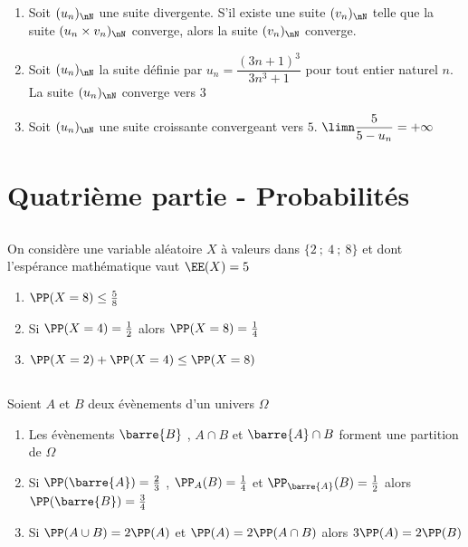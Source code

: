 \documentclass[oneside,12pt]{article}
\begin{document}
\subsection{}
\begin{enumerate}
	\item Soit $(u_n)_{\nN}$ une suite divergente. S'il existe une suite $(v_n)_{\nN}$ telle que la suite $(u_n\times v_n)_{\nN}$ converge, alors la suite $(v_n)_{\nN}$ converge.
	\item Soit $(u_n)_{\nN}$ la suite définie par $u_n=\dfrac{(3n+1)^3}{3n^3+1}$ pour tout entier naturel $n$. La suite $(u_n)_{\nN}$ converge vers $3$
	\item Soit $(u_n)_{\nN}$ une suite croissante convergeant vers $5$. $\limn \dfrac{5}{5-u_n}=+\infty$
\end{enumerate}



\section*{Quatrième partie - Probabilités}

\subsection{}
On considère une variable aléatoire $X$ à valeurs dans $\{2~;~4~;~8\}$ et dont l'espérance mathématique vaut $\EE(X)=5$
\begin{enumerate}
	\item $\PP(X=8)\leq \frac{5}{8}$
	\item Si $\PP(X=4)=\frac{1}{2}$ alors $\PP(X=8)=\frac{1}{4}$
	\item $\PP(X=2)+\PP(X=4)\leq \PP(X=8)$
\end{enumerate}



\subsection{}
Soient $A$ et $B$ deux évènements d'un univers $\Omega$
\begin{enumerate}
	\item Les évènements $\barre{B}$ , $A \cap B$ et $\barre{A} \cap B$ forment une partition de $\Omega$
	\item Si $\PP(\barre{A})=\frac{2}{3}$ , $\PP_A(B)=\frac{1}{4}$ et $\PP_{\barre{A}}(B)=\frac{1}{2}$ alors $\PP(\barre{B})=\frac{3}{4}$
	\item Si $\PP(A \cup B)=2\PP(A)$ et $\PP(A)=2\PP(A \cap B)$ alors $3\PP(A)=2\PP(B)$
\end{enumerate}
\end{document}
